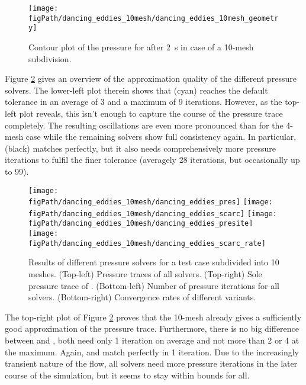 \begin{figure}[ht]
\begin{center}
\texttt{[image: \\figPath/dancing\_eddies\_10mesh/dancing\_eddies\_10mesh\_geometry]}
\end{center}
\caption[Results of the {} test cases with 10 meshes]{Contour plot of the pressure for \uscarc{} after 2~s in case of a 10-mesh subdivision.}
\label{FIG_scarc_dancing_eddies_ten}
\end{figure}

Figure \ref{FIG_scarc_dancing_eddies_ten_convergence} gives an overview of the approximation quality of the different pressure solvers.
The lower-left plot therein shows that  \fftdefault{} (cyan) reaches the default tolerance  in an average of 3 and a maximum of 9 iterations.
However, as the top-left plot reveals, this isn't enough to capture the course of the pressure trace completely. The resulting oscillations are even more pronounced than for the 4-mesh case while the remaining solvers show full consistency again.
In particular, \ffttight{} (black) matches perfectly, but it also needs comprehensively more pressure iterations to fulfil the finer tolerance (averagely 28 iterations, but occasionally up to 99). %

\begin{figure}[ht]
\begin{center}
\texttt{[image: \\figPath/dancing\_eddies\_10mesh/dancing\_eddies\_pres]}
\texttt{[image: \\figPath/dancing\_eddies\_10mesh/dancing\_eddies\_scarc]}
\texttt{[image: \\figPath/dancing\_eddies\_10mesh/dancing\_eddies\_presite]}
\texttt{[image: \\figPath/dancing\_eddies\_10mesh/dancing\_eddies\_scarc\_rate]}
\end{center}
\caption[Results for a 10-mesh computation of the {} case]{Results of different pressure solvers for a  {} test case subdivided into 10 meshes. (Top-left) Pressure traces of all solvers. (Top-right) Sole pressure trace of \scarcdefault{}.
(Bottom-left) Number of pressure iterations for all solvers.
(Bottom-right) Convergence rates of different \scarc{} variants. }
\label{FIG_scarc_dancing_eddies_ten_convergence}
\end{figure}

The top-right plot of Figure \ref{FIG_scarc_dancing_eddies_ten_convergence} proves that the 10-mesh \scarcdefault{} already gives a sufficiently good approximation of the pressure trace.
Furthermore, there is no big difference between \scarcdefault{} and \scarctight{}, both need only 1 iteration on average and not more than 2 or 4 at the maximum. Again, \uscarc{} and \uglmat{} match perfectly in 1 iteration.
Due to the increasingly transient nature of the flow, all solvers need more pressure iterations in the later course of the simulation, but it seems to stay within bounds for all.

